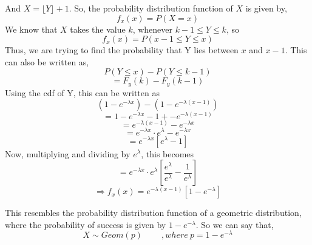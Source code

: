 \documentclass{article}
\begin{document}
			And $X = \lfloor Y \rfloor + 1$. So, the probability distribution function of $X$ is given by,
			$$ f_x(x) = P(X=x) $$
			We know that $X$ takes the value $k$, whenever $k-1 \leq Y \leq k$, so
			$$ f_x(x) = P(x-1\leq Y \leq x) $$
			Thus, we are trying to find the probability that Y lies between $x$ and $x-1$. This can also be written as,
			$$ P(Y \leq x) - P(Y \leq k-1) $$
			$$ = F_y(k) - F_y(k-1) $$
			Using the cdf of Y, this can be written as
			$$ \left( 1-e^{-\lambda x} \right) - \left( 1 - e^{-\lambda (x-1)} \right) $$
			$$ = 1 -e^{-\lambda x}-1+-e^{-\lambda (x-1)} $$
			$$ =e^{-\lambda (x-1)}-e^{-\lambda x}$$
			$$ = e^{-\lambda x} \cdot e^{\lambda} -e^{-\lambda x} $$
			$$ = e^{-\lambda x}[e^\lambda -1] $$
			Now, multiplying and dividing by $e^\lambda$, this becomes
			$$ = e^{-\lambda x} \cdot e^{\lambda} \left[\frac{e^\lambda}{e^\lambda}-\frac{1}{e^\lambda}\right]$$
			$$ \Rightarrow f_x(x)= e^{-\lambda (x-1)} [1-e^{-\lambda}]$$ 

			This resembles the probability distribution function of a geometric distribution, where the probability of success is given by $1-e^{-\lambda}$. So we can say that,
			$$ X \sim Geom(p) \; \; \; \; \; \; \; \; ,where\ p = 1-e^{-\lambda}$$

	
\end{document}
